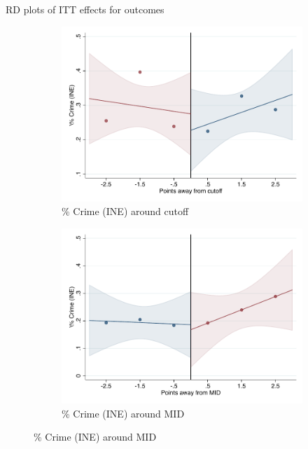 \documentclass[notes,11pt, aspectratio=169]{beamer}
\begin{document}
\begin{frame}{RD plots of ITT effects for outcomes}
\hyperlink{ITT_rd_plot_IPN}{}
\begin{figure}

    \begin{subfigure}{0.45\textwidth}
        \centering
        \caption{\% Crime (INE) around cutoff}
        \includegraphics[width=\textwidth]{04_Figures/rd_plot_tau_Suspencion_INE_IPN3.pdf}
    \end{subfigure}
    \begin{subfigure}{0.45\textwidth}
        \centering
        \caption{\% Crime (INE) around MID}
        \includegraphics[width=\textwidth]{04_Figures/rd_plot_mid_Suspencion_INE_IPN3.pdf}
    \end{subfigure}
    
\end{figure}
\end{frame}
\end{document}
